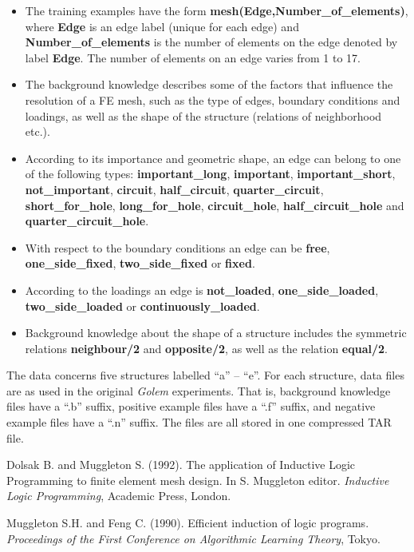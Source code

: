 \begin{itemize}
\item The training examples have the form
	{\bf mesh(Edge,Number\_of\_elements)}, where {\bf Edge} is an edge label
	(unique for each edge) and {\bf Number\_of\_elements} is the number
	of elements on the edge denoted by label {\bf Edge}. The number of elements
	on an edge varies from 1 to 17.
\item The background knowledge describes some of the factors that
	influence the resolution of a FE mesh, such as the type of edges,
	boundary conditions and loadings, as well as the shape of the
	structure (relations of neighborhood etc.).
\item According to its importance and geometric shape, an edge can belong to one
	of the following types: {\bf important\_long}, {\bf important},
	{\bf important\_short}, {\bf not\_important}, {\bf circuit},
	{\bf half\_circuit}, {\bf quarter\_circuit}, {\bf short\_for\_hole},
	{\bf long\_for\_hole}, {\bf circuit\_hole}, {\bf half\_circuit\_hole} and
	{\bf quarter\_circuit\_hole}. 
\item With respect to the boundary conditions an edge can be {\bf free},
	{\bf one\_side\_fixed}, {\bf two\_side\_fixed} or {\bf fixed}.
\item According to the loadings an edge is {\bf not\_load\-ed},
	{\bf one\_side\_load\-ed}, {\bf two\_si\-de\_load\-ed}  or
	{\bf continuously\_load\-ed}.
\item Background knowledge about the shape of a structure includes the
	symmetric relations {\bf neighbour/2} and {\bf opposite/2}, as well as the
	relation {\bf equal/2}.
\end{itemize}

The data concerns five structures labelled ``a'' -- ``e''. For each
structure, data files are as used in the original {\em Golem\/}
experiments. That is, background knowledge files have a ``.b'' suffix,
positive example files have a ``.f'' suffix, and negative example files
have a ``.n'' suffix. The files are all stored in one compressed TAR file.

\begin{thebibliography}{}

Dolsak B. and Muggleton S. (1992).
The application of Inductive Logic Programming to 
finite element mesh design.
In S. Muggleton editor.
{\sl Inductive Logic Programming}, Academic Press, London.

Muggleton S.H. and Feng C. (1990).
Efficient induction of logic programs.
{\sl Proceedings of the First Conference on Algorithmic Learning Theory},
Tokyo.


\end{thebibliography}



